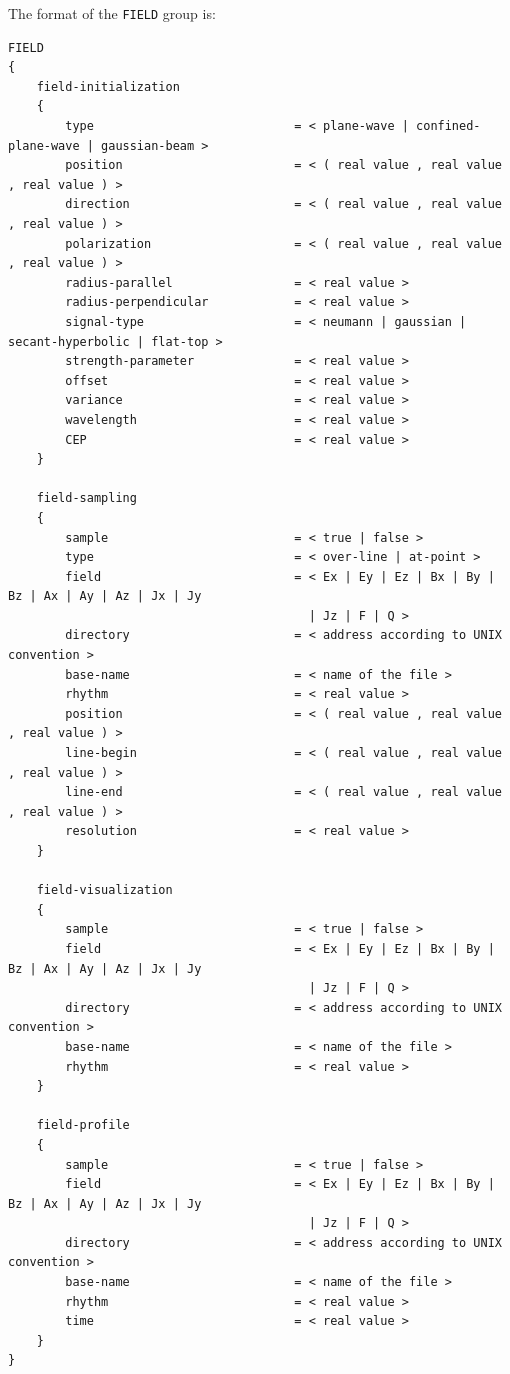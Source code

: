 The format of the \texttt{FIELD} group is:
\begin{Verbatim}[frame=single,fontsize=\small,tabsize=4]
FIELD
{
	field-initialization
	{
		type                            = < plane-wave | confined-plane-wave | gaussian-beam >
		position                        = < ( real value , real value , real value ) >
		direction                       = < ( real value , real value , real value ) >
		polarization                    = < ( real value , real value , real value ) >
		radius-parallel                 = < real value >
		radius-perpendicular            = < real value >
		signal-type                     = < neumann | gaussian | secant-hyperbolic | flat-top >
		strength-parameter              = < real value >
		offset                          = < real value >
		variance                        = < real value >
		wavelength                      = < real value >
		CEP                             = < real value >
	}
	
	field-sampling
	{
		sample                          = < true | false >
		type							= < over-line | at-point >
		field                           = < Ex | Ey | Ez | Bx | By | Bz | Ax | Ay | Az | Jx | Jy
                                          | Jz | F | Q >
		directory                       = < address according to UNIX convention >
		base-name                       = < name of the file >
		rhythm                          = < real value >
		position                        = < ( real value , real value , real value ) >
		line-begin                      = < ( real value , real value , real value ) >
		line-end                        = < ( real value , real value , real value ) >
		resolution                      = < real value >
	}

	field-visualization
	{
		sample                          = < true | false >
		field                           = < Ex | Ey | Ez | Bx | By | Bz | Ax | Ay | Az | Jx | Jy
                                          | Jz | F | Q >
		directory                       = < address according to UNIX convention >
		base-name                       = < name of the file >
		rhythm                          = < real value >
	}
	
	field-profile
	{
		sample                          = < true | false >
		field                           = < Ex | Ey | Ez | Bx | By | Bz | Ax | Ay | Az | Jx | Jy
                                          | Jz | F | Q >
		directory                       = < address according to UNIX convention >
		base-name                       = < name of the file >
		rhythm                          = < real value >
		time                            = < real value >
	}
}
\end{Verbatim}

